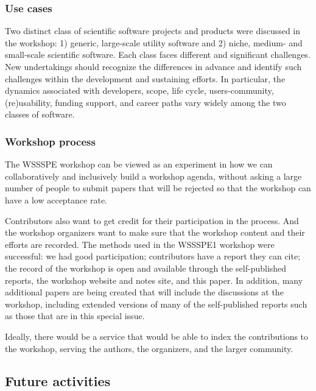 \documentclass[11pt, oneside]{amsart}
\newcommand{\note}[1]{ {\textcolor{red}    { #1 }}}
\begin{document}

\subsubsection*{Use cases}
Two distinct class of scientific software projects and products were
discussed in the workshop: 1) generic, large-scale utility software
and 2) niche, medium- and small-scale scientific software. Each class
faces different and significant challenges. New undertakings should
recognize the differences in advance and identify such challenges
within the development and sustaining efforts. In particular, the
dynamics associated with developers, scope, life cycle,
users-community, (re)usability, funding support, and career paths vary
widely among the two classes of software.


\subsubsection*{Workshop process}
The WSSSPE workshop can be viewed as an experiment in how we can
collaboratively and inclusively build a workshop agenda, without
asking a large number of people to submit papers that will be rejected
so that the workshop can have a low acceptance rate.

Contributors also want to get credit for their participation in the
process.  And the workshop organizers want to make sure that the
workshop content and their efforts are recorded.  The methods used in
the WSSSPE1 workshop were successful: we had good participation;  
contributors have a report they can cite;   the record of the
workshop is open and available through the self-published reports,
the workshop website and notes site, and this paper.  In addition,
many additional papers are being created that will include the
discussions at the workshop, including extended versions of many of
the self-published reports such as those that are in this special
issue.

Ideally, there would be a service that would be able to index the
contributions to the workshop, serving the authors, the organizers,
and the larger community.

\subsection{Future activities} \label{sec:future}
\end{document}
